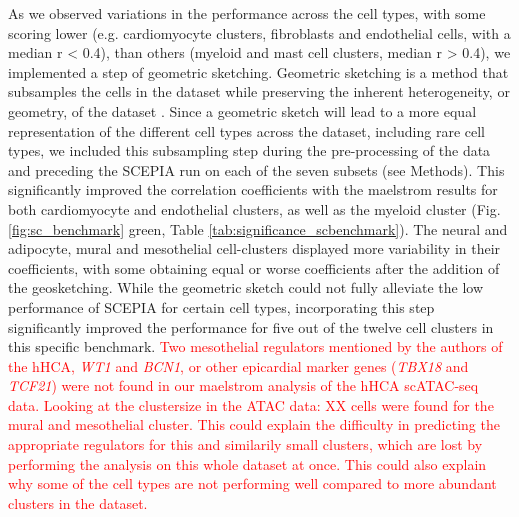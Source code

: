 As we observed variations in the performance across the cell types, with some scoring lower (e.g. cardiomyocyte clusters, fibroblasts and endothelial cells, with a median r < 0.4), than others (myeloid and mast cell clusters, median r > 0.4), we implemented a step of geometric sketching. Geometric sketching is a method that subsamples the cells in the dataset while preserving the inherent heterogeneity, or geometry, of the dataset \cite{Hie2019}. Since a geometric sketch will lead to a more equal representation of the different cell types across the dataset, including rare cell types, we included this subsampling step during the pre-processing of the data and preceding the SCEPIA run on each of the seven subsets (see Methods). This significantly improved the correlation coefficients with the maelstrom results for both cardiomyocyte and endothelial clusters, as well as the myeloid cluster (Fig. \ref{fig:sc_benchmark} green, Table \ref{tab:significance_scbenchmark}). The neural and adipocyte, mural and mesothelial cell-clusters displayed more variability in their coefficients, with some obtaining equal or worse coefficients after the addition of the geosketching. While the geometric sketch could not fully alleviate the low performance of SCEPIA for certain cell types, incorporating this step significantly improved the performance for five out of the twelve cell clusters in this specific benchmark. 
\textcolor{red}{Two mesothelial regulators mentioned by the authors of the hHCA, \textit{WT1} and \textit{BCN1}, or other epicardial marker genes (\textit{TBX18} and \textit{TCF21}) were not found in our maelstrom analysis of the hHCA scATAC-seq data. Looking at the clustersize in the ATAC data: XX cells were found for the mural and mesothelial cluster. This could explain the difficulty in predicting the appropriate regulators for this and similarily small clusters, which are lost by performing the analysis on this whole dataset at once. This could also explain why some of the cell types are not performing well compared to more abundant clusters in the dataset.}

